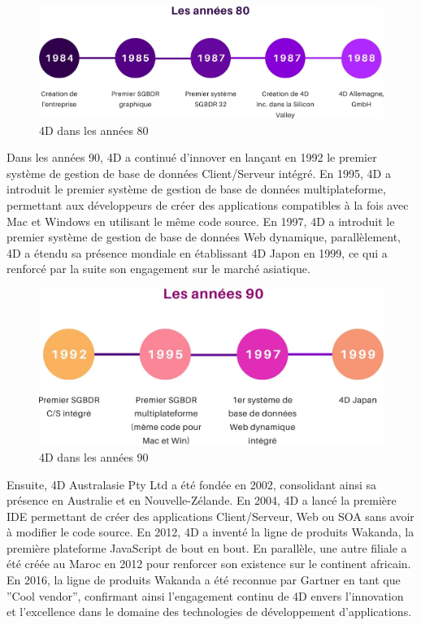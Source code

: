 \begin{figure}[h]
    \centering
    \includegraphics[scale=0.3]{Images/80.jpg} %
    \caption{4D dans les années 80}
    \label{fig:Histoire80}
\end{figure}
\vspace{1cm}
Dans les années 90, 4D a continué d’innover en lançant en 1992 le premier système
de gestion de base de données Client/Serveur intégré. En 1995, 4D a introduit le premier
système de gestion de base de données multiplateforme, permettant aux développeurs de
créer des applications compatibles à la fois avec Mac et Windows en utilisant le même code
source. En 1997, 4D a introduit le premier système de gestion de base de données Web
dynamique, parallèlement, 4D a étendu sa présence mondiale en établissant 4D Japon en
1999, ce qui a renforcé par la suite son engagement sur le marché asiatique.
\newline

\begin{figure}[h]
    \centering
    \includegraphics[scale=0.3]{Images/90.jpg} %
    \caption{4D dans les années 90}
    \label{fig:Histoire90}
\end{figure}

Ensuite, 4D Australasie Pty Ltd a été fondée en 2002, consolidant ainsi sa présence
en Australie et en Nouvelle-Zélande. En 2004, 4D a lancé la première IDE permettant de
créer des applications Client/Serveur, Web ou SOA sans avoir à modifier le code source.
En 2012, 4D a inventé la ligne de produits Wakanda, la première plateforme JavaScript de
bout en bout. En parallèle, une autre filiale a été créée au Maroc en 2012 pour renforcer
son existence sur le continent africain.
En 2016, la ligne de produits Wakanda a été reconnue par Gartner en tant que ”Cool
vendor”, confirmant ainsi l’engagement continu de 4D envers l’innovation et l’excellence
dans le domaine des technologies de développement d’applications.
\vspace{2cm}

